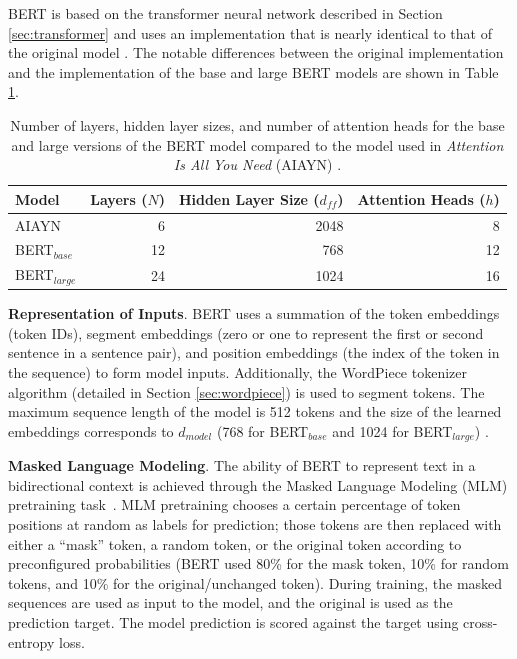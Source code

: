\documentclass[12pt]{article}
\begin{document}
BERT is based on the transformer neural network described in Section \ref{sec:transformer} and uses an implementation that is nearly identical to that
of the original model \cite{devlin_bert_2019,vaswani_attention_2017}. The notable differences between the original implementation and the
implementation of the base and large BERT models are shown in Table \ref{tab:bert_params}.

\begin{table}
    \centering
    \begin{tabular}{l r r r}
        \toprule
        Model          & Layers ($N$) & Hidden Layer Size ($d_{ff}$) & Attention Heads ($h$) \\
        \midrule
        AIAYN          & 6            & 2048                         & 8                     \\
        BERT$_{base}$  & 12           & 768                          & 12                    \\
        BERT$_{large}$ & 24           & 1024                         & 16                    \\
        \bottomrule
    \end{tabular}
    \caption{Number of layers, hidden layer sizes, and number of attention heads for the base and large versions of the BERT model
        compared to the model used in \textit{Attention Is All You Need} (AIAYN) \cite{devlin_bert_2019,vaswani_attention_2017}.}
    \label{tab:bert_params}
\end{table}

\textbf{Representation of Inputs}. BERT uses a summation of the token embeddings (token IDs), segment embeddings (zero or one to represent the first
or second sentence in a sentence pair), and position embeddings (the index of the token in the sequence) to form model inputs. Additionally, the
WordPiece tokenizer algorithm (detailed in Section \ref{sec:wordpiece}) is used to segment tokens. The maximum sequence length of the model is 512
tokens and the size of the learned embeddings corresponds to $d_{model}$ (768 for BERT$_{base}$ and 1024 for BERT$_{large}$) \cite{devlin_bert_2019}.

\textbf{Masked Language Modeling}. The ability of BERT to represent text in a bidirectional context is achieved through the Masked Language Modeling
(MLM) pretraining task~\cite{devlin_bert_2019}. MLM pretraining chooses a certain percentage of token positions at random as labels for prediction;
those tokens are then replaced with either a ``mask'' token, a random token, or the original token according to preconfigured probabilities (BERT used
80\% for the mask token, 10\% for random tokens, and 10\% for the original/unchanged token). During training, the masked sequences are used as input
to the model, and the original is used as the prediction target. The model prediction is scored against the target using cross-entropy loss.
\end{document}
